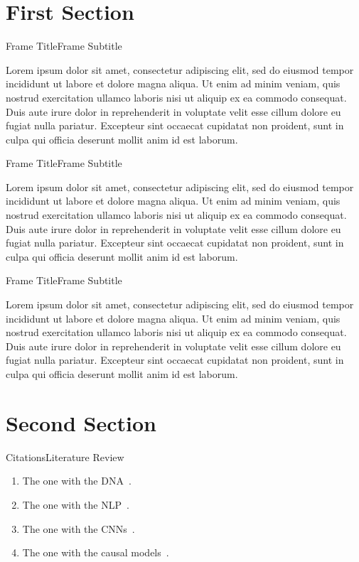 \section{First Section}

\begin{frame}{Frame Title}{Frame Subtitle }

  Lorem ipsum dolor sit amet, consectetur adipiscing elit, sed do eiusmod tempor incididunt ut labore et dolore magna aliqua. Ut enim ad minim veniam, quis nostrud exercitation ullamco laboris nisi ut aliquip ex ea commodo consequat. Duis aute irure dolor in reprehenderit in voluptate velit esse cillum dolore eu fugiat nulla pariatur. Excepteur sint occaecat cupidatat non proident, sunt in culpa qui officia deserunt mollit anim id est laborum.

\end{frame}

\begin{frame}{Frame Title}{Frame Subtitle }

  Lorem ipsum dolor sit amet, consectetur adipiscing elit, sed do eiusmod tempor incididunt ut labore et dolore magna aliqua. Ut enim ad minim veniam, quis nostrud exercitation ullamco laboris nisi ut aliquip ex ea commodo consequat. Duis aute irure dolor in reprehenderit in voluptate velit esse cillum dolore eu fugiat nulla pariatur. Excepteur sint occaecat cupidatat non proident, sunt in culpa qui officia deserunt mollit anim id est laborum.

\end{frame}

\begin{frame}{Frame Title}{Frame Subtitle }

  Lorem ipsum dolor sit amet, consectetur adipiscing elit, sed do eiusmod tempor incididunt ut labore et dolore magna aliqua. Ut enim ad minim veniam, quis nostrud exercitation ullamco laboris nisi ut aliquip ex ea commodo consequat. Duis aute irure dolor in reprehenderit in voluptate velit esse cillum dolore eu fugiat nulla pariatur. Excepteur sint occaecat cupidatat non proident, sunt in culpa qui officia deserunt mollit anim id est laborum.

\end{frame}

\section{Second Section}

\begin{frame}{Citations}{Literature Review }
  \begin{enumerate}
    \item The one with the DNA~\parencite{geraci2019technology}.
    \item The one with the NLP~\parencite{massidda2020rmassidda}.
    \item The one with the CNNs~\parencite{massidda2023knowledge}.
    \item The one with the causal models~\parencite{massidda2023causal}.
  \end{enumerate}
\end{frame}
